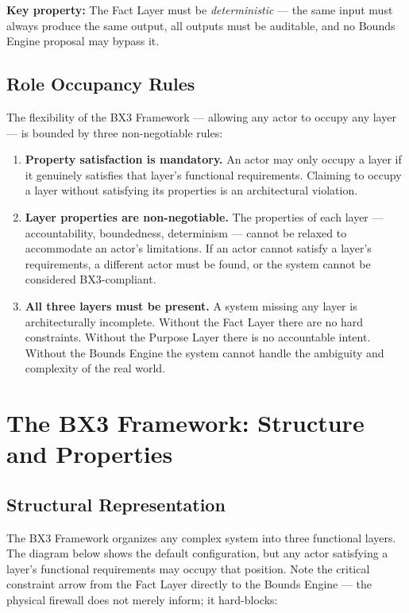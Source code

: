 \documentclass[12pt]{article}
\begin{document}
\textbf{Key property:} The Fact Layer must be \textit{deterministic} --- the same input must always produce the same output, all outputs must be auditable, and no Bounds Engine proposal may bypass it.

\subsection{Role Occupancy Rules}

The flexibility of the BX3 Framework --- allowing any actor to occupy any layer --- is bounded by three non-negotiable rules:

\begin{enumerate}[noitemsep]
    \item \textbf{Property satisfaction is mandatory.} An actor may only occupy a layer if it genuinely satisfies that layer's functional requirements. Claiming to occupy a layer without satisfying its properties is an architectural violation.
    \item \textbf{Layer properties are non-negotiable.} The properties of each layer --- accountability, boundedness, determinism --- cannot be relaxed to accommodate an actor's limitations. If an actor cannot satisfy a layer's requirements, a different actor must be found, or the system cannot be considered BX3-compliant.
    \item \textbf{All three layers must be present.} A system missing any layer is architecturally incomplete. Without the Fact Layer there are no hard constraints. Without the Purpose Layer there is no accountable intent. Without the Bounds Engine the system cannot handle the ambiguity and complexity of the real world.
\end{enumerate}

\section{The BX3 Framework: Structure and Properties}
\label{sec:structure}

\subsection{Structural Representation}

The BX3 Framework organizes any complex system into three functional layers. The diagram below shows the default configuration, but any actor satisfying a layer's functional requirements may occupy that position. Note the critical constraint arrow from the Fact Layer directly to the Bounds Engine --- the physical firewall does not merely inform; it hard-blocks:
\end{document}
